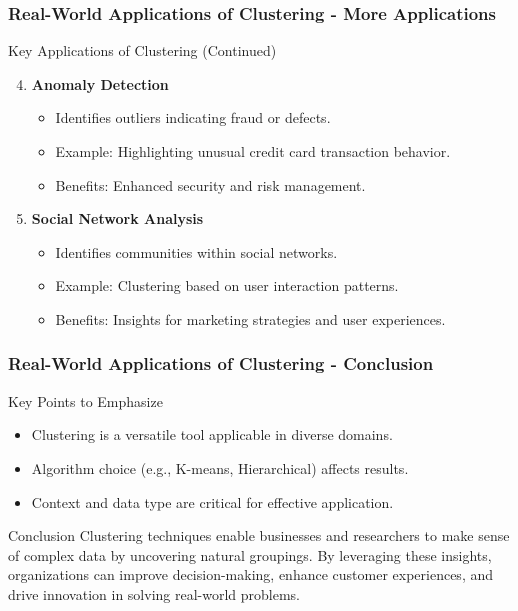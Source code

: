 \documentclass[aspectratio=169]{beamer}
\begin{document}
\begin{frame}[fragile]
    \frametitle{Real-World Applications of Clustering - More Applications}
    \begin{block}{Key Applications of Clustering (Continued)}
        \begin{enumerate}
            \setcounter{enumi}{3}
            \item \textbf{Anomaly Detection}
                \begin{itemize}
                    \item Identifies outliers indicating fraud or defects.
                    \item Example: Highlighting unusual credit card transaction behavior.
                    \item Benefits: Enhanced security and risk management.
                \end{itemize}
                
            \item \textbf{Social Network Analysis}
                \begin{itemize}
                    \item Identifies communities within social networks.
                    \item Example: Clustering based on user interaction patterns.
                    \item Benefits: Insights for marketing strategies and user experiences.
                \end{itemize}
        \end{enumerate}
    \end{block}
\end{frame}

\begin{frame}[fragile]
    \frametitle{Real-World Applications of Clustering - Conclusion}
    \begin{block}{Key Points to Emphasize}
        \begin{itemize}
            \item Clustering is a versatile tool applicable in diverse domains.
            \item Algorithm choice (e.g., K-means, Hierarchical) affects results.
            \item Context and data type are critical for effective application.
        \end{itemize}
    \end{block}
    
    \begin{block}{Conclusion}
        Clustering techniques enable businesses and researchers to make sense of complex data by uncovering natural groupings. 
        By leveraging these insights, organizations can improve decision-making, enhance customer experiences, 
        and drive innovation in solving real-world problems.
    \end{block}
\end{frame}
\end{document}

